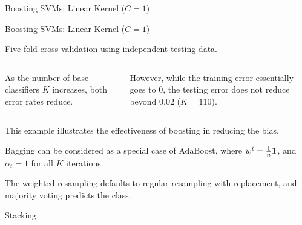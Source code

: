 {\begin{frame}[fragile]{Boosting SVMs: Linear Kernel ($C=1$)}
\end{frame}

\begin{frame}[fragile]{Boosting SVMs: Linear Kernel ($C=1$)}
	
  Five-fold cross-validation using independent testing data.

	\medskip

\begin{columns}
\hspace*{0.5cm}
  As the number of
  base classif\/{i}ers $K$ increases, both error
  rates reduce. 

	\medskip

  However, while the training error essentially
  goes to $0$, the
	testing error does not reduce beyond $0.02$ ($K=110$).


\end{columns}

	\vspace*{0.7cm}

  This example illustrates the effectiveness of boosting in
  reducing the bias.

	\medskip
Bagging can be considered as a special case of AdaBoost, where
$w^t = \tfrac{1}{n} \mathbf{1}$, and $\alpha_t = 1$
for all $K$ iterations. 

\medskip

The weighted resampling defaults
to regular resampling with replacement, and majority voting predicts the class.

\end{frame}



\begin{frame}{Stacking}


\end{frame}}
